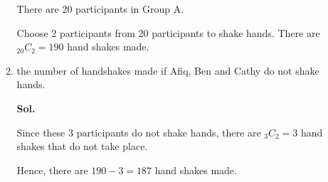 \documentclass{report}
\newcommand\comb[2][^n]{{}_{#1}C_{#2}}
\newcommand{\sol}[1]{

      \noindent \textbf{Sol.}
}
\def\eos{\quad\hbox{\rlap{\hbox{\vrule depth 1.5pt height 2.6mm width 0.2mm \hskip 1mm \vrule height 2.6mm width 0.2mm}}{\vbox{\hrule height 0.2mm width 1.4mm \vskip 2.8mm \hrule depth 1.5pt height -0.35mm width 1.2mm}}}}
\begin{document}
\begin{multicols*}{2}
\begin{enumerate}
\begin{enumerate}
                              There are 20 participants in Group A.

                              Choose 2 participants from 20 participants to shake hands. There are
                              $\comb[20]{2} = 190$ hand shakes made. $\eos$

                        \item the number of handshakes made if Afiq, Ben and Cathy do not shake hands. \sol{}

                              Since these 3 participants do not shake hands, there are $\comb[3]{2} = 3$ hand
                              shakes that do not take place.

                              Hence, there are $190 - 3 = 187$ hand shakes made. $\eos$
                  \end{enumerate}
      \end{enumerate}
\end{multicols*}
\end{document}
